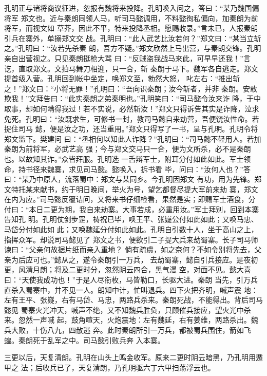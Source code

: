 孔明正与诸将商议征进，忽报有魏将来投降。孔明唤入问之，答曰：“某乃魏国偏将军
郑文也。近与秦朗同领人马，听司马懿调用，不料懿徇私偏向，加秦朗为前将军，而视文如
草芥，因此不平，特来投降丞相。愿赐收录。”言未已，人报秦朗引兵在寨外，单搦郑文交
战。孔明曰：“此人武艺比汝若何？”郑文曰：“某当立斩之。”孔明曰：“汝若先杀秦
朗，吾方不疑。”郑文欣然上马出营，与秦朗交锋。孔明亲自出营视之。只见秦朗挺枪大骂
曰：“反贼盗我战马来此，可早早还我！”言讫，直取郑文。文拍马舞刀相迎，只一合，斩
秦朗于马下。魏军各自逃走。郑文提首级入营。孔明回到帐中坐定，唤郑文至，勃然大怒，
叱左右：“推出斩之！”郑文曰：“小将无罪！”孔明曰：“吾向识秦朗；汝今斩者，并非
秦朗。安敢欺我！”文拜告曰：“此实秦朗之弟秦明也。”孔明笑曰：“司马懿令汝来诈
降，于中取事，却如何瞒得我过！若不实说，必然斩汝！”郑文只得诉告其实是诈降，泣求
免死。孔明曰：“汝既求生，可修书一封，教司马懿自来劫营，吾便饶汝性命。若捉住司马
懿，便是汝之功，还当重用。”郑文只得写了一书，呈与孔明。孔明令将郑文监下。樊建问
曰：“丞相何以知此人诈降？”孔明曰：“司马懿不轻用人。若加秦朗为前将军，必武艺高
强；今与郑文交马只一合，便为文所杀，必不是秦朗也。以故知其诈。”众皆拜服。孔明选
一舌辩军士，附耳分付如此如此。军士领命，持书径来魏寨，求见司马懿。懿唤入，拆书看
毕，问曰：“汝何人也？”答曰：“某乃中原人，流落蜀中：郑文与某同乡。今孔明因郑文
有功，用为先锋。郑文特托某来献书，约于明日晚间，举火为号，望乞都督尽提大军前来劫
寨，郑文在内为应。”司马懿反覆诘问，又将来书仔细检看，果然是实；即赐军士酒食，分
付曰：“本日二更为期，我自来劫寨。大事若成，必重用汝。”军士拜别，回到本寨告知孔
明。孔明仗剑步罡，祷祝已毕，唤王平、张嶷公付如此如此；又唤马忠、马岱分付如此如
此；又唤魏延分付如此如此。孔明自引数十人，坐于高山之上，指挥众军。却说司马懿见了
郑文之书，便欲引二子提大兵来劫蜀寨。长子司马师谏曰：“父亲何故据片纸而亲入重地？
倘有疏虞，如之奈何？不如令别将先去，父亲为后应可也。”懿从之，遂令秦朗引一万兵，
去劫蜀寨，懿自引兵接应。是夜初更，风清月朗；将及二更时分，忽然阴云四合，黑气漫
空，对面不见。懿大喜曰：“天使我成功也！”于是人尽衔枚，马皆勒口，长驱大进。秦朗
当先，引万兵直杀入蜀寨中，并不见一人。朗知中计，忙叫退兵。四下火把齐明，喊声震
地：左有王平、张嶷，右有马岱、马忠，两路兵杀来。秦朗死战，不能得出。背后司马懿见
蜀寨火光冲天，喊声不绝，又不知魏兵胜负，只顾催兵接应，望火光中杀来。忽然一声喊
起，鼓角喧天，火炮震地：左有魏延，右有姜维，两路杀出。魏兵大败，十伤八九，四散逃
奔。此时秦朗所引一万兵，都被蜀兵围住，箭如飞蝗。秦朗死于乱军之中。司马懿引败兵奔
入本寨。

三更以后，天复清朗。孔明在山头上鸣金收军。原来二更时阴云暗黑，乃孔明用遁甲之
法；后收兵已了，天复清朗，乃孔明驱六丁六甲扫荡浮云也。

